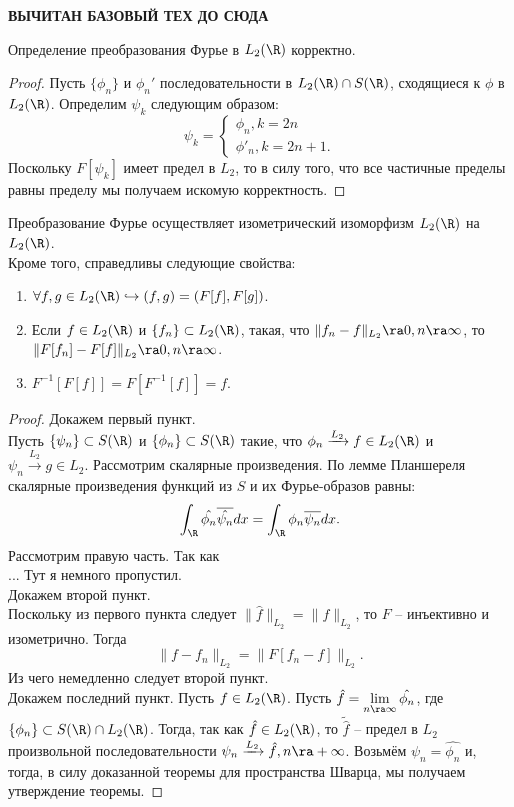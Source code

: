 \textbf{ВЫЧИТАН БАЗОВЫЙ ТЕХ ДО СЮДА}


\begin{theorem}
    Определение преобразования Фурье в $L_2(\R)$ корректно.
\end{theorem}
\begin{proof}
    Пусть $\{\phi_n\}$ и $\phi_n'$ последовательности в $L_2(\R) \cap S(\R)$, сходящиеся к $\phi$ в $L_2(\R)$.
    Определим $\psi_k$ следующим образом:
    \[
        \psi_k = \begin{cases}
                     \phi_n, k = 2n \\
                     \phi'_n, k = 2n + 1.
        \end{cases}
    \]
    Поскольку $F[\psi_k]$ имеет предел в $L_2$, то в силу того, что все частичные пределы равны пределу мы получаем искомую корректность.
\end{proof}
\begin{theorem}
    Преобразование Фурье осуществляет изометрический изоморфизм $L_2(\R)$ на $L_2(\R)$. \\
    Кроме того, справедливы следующие свойства:
    \begin{enumerate}
        \item $\forall f, g \in L_2(\R) \hookrightarrow (f, g) = (F[f], F[g])$.
        \item Если $f \in L_2(\R)$ и $\{f_n\} \subset L_2(\R)$, такая, что $\|f_n - f\|_{L_2} \ra 0, n \ra \infty$, то $\|F[f_n] - F[f]\|_{L_2} \ra 0, n \ra \infty$.
        \item $F^{-1}[F[f]] = F[F^{-1}[f]] = f$.
    \end{enumerate}
\end{theorem}
\begin{proof}
    Докажем первый пункт. \\
    Пусть $\{\psi_n\} \subset S(\R)$ и $\{\phi_n\} \subset S(\R)$ такие, что $\phi_n \xrightarrow{L_2} f \in L_2(\R)$ и $\psi_n \xrightarrow{L_2} g \in L_2$.
    Рассмотрим скалярные произведения. По лемме Планшереля скалярные произведения функций из $S$ и их Фурье-образов равны:
    \[
        \int_{\R} \hat{\phi_n} \overline{\hat{\psi_n}}dx = \int_{\R} \phi_n \overline{\psi_n} dx.
    \]
    Рассмотрим правую часть. Так как
    \[

    \]
    ... Тут я немного пропустил. \\
    Докажем второй пункт. \\
    Поскольку из первого пункта следует $\|\hat{f}\|_{L_2} = \|f\|_{L_2}$, то $F$ -- инъективно и изометрично.
    Тогда
    \[
        \|f - f_n\|_{L_2} = \|F[f_n - f]\|_{L_2}.
    \]
    Из чего немедленно следует второй пункт. \\
    Докажем последний пункт.
    Пусть $f \in L_2(\R)$.
    Пусть $\hat{f} = \lim\limits_{n \ra \infty} \hat{\phi_n}$, где $\{\phi_n\} \subset S(\R) \cap L_2(\R)$.
    Тогда, так как $\hat{f} \in L_2(\R)$, то $\tilde{\hat{f}}$ -- предел в $L_2$ произвольной последовательности $\psi_n \xrightarrow{L_2} \hat{f}, n \ra +\infty$.
    Возьмём $\psi_n = \hat{\phi_n}$ и, тогда, в силу доказанной теоремы для пространства Шварца, мы получаем утверждение теоремы.
\end{proof}
